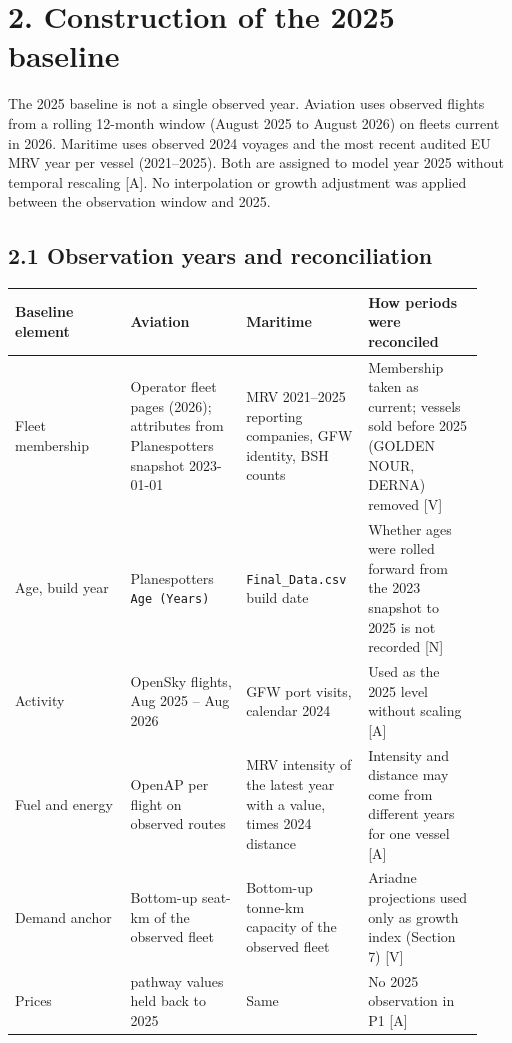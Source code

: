 \documentclass[11pt,a4paper]{article}
\begin{document}
\section*{2. Construction of the 2025 baseline}

The 2025 baseline is not a single observed year. Aviation uses observed flights from a rolling 12-month window (August 2025 to August 2026) on fleets current in 2026. Maritime uses observed 2024 voyages and the most recent audited EU MRV year per vessel (2021–2025). Both are assigned to model year 2025 without temporal rescaling [A]. No interpolation or growth adjustment was applied between the observation window and 2025.

\subsection*{2.1 Observation years and reconciliation}

{\small\setlength{\tabcolsep}{3pt}
\begin{longtable}{>{\raggedright\arraybackslash}p{0.233\linewidth}>{\raggedright\arraybackslash}p{0.233\linewidth}>{\raggedright\arraybackslash}p{0.233\linewidth}>{\raggedright\arraybackslash}p{0.233\linewidth}}
\toprule
\textbf{Baseline element} & \textbf{Aviation} & \textbf{Maritime} & \textbf{How periods were reconciled} \tabularnewline
\midrule
\endhead
Fleet membership & Operator fleet pages (2026); attributes from Planespotters snapshot 2023-01-01 & MRV 2021–2025 reporting companies, GFW identity, BSH counts & Membership taken as current; vessels sold before 2025 (GOLDEN NOUR, DERNA) removed [V] \tabularnewline
Age, build year & Planespotters \texttt{Age (Years)} & \texttt{Final\_\allowbreak{}Data.\allowbreak{}csv} build date & Whether ages were rolled forward from the 2023 snapshot to 2025 is not recorded [N] \tabularnewline
Activity & OpenSky flights, Aug 2025 – Aug 2026 & GFW port visits, calendar 2024 & Used as the 2025 level without scaling [A] \tabularnewline
Fuel and energy & OpenAP per flight on observed routes & MRV intensity of the latest year with a value, times 2024 distance & Intensity and distance may come from different years for one vessel [A] \tabularnewline
Demand anchor & Bottom-up seat-km of the observed fleet & Bottom-up tonne-km capacity of the observed fleet & Ariadne projections used only as growth index (Section 7) [V] \tabularnewline
Prices & 2030 pathway values held back to 2025 & Same & No 2025 observation in P1 [A] \tabularnewline
\bottomrule
\end{longtable}}
\end{document}
